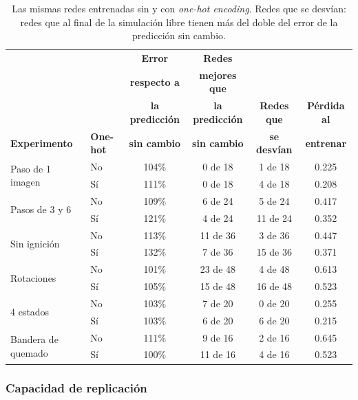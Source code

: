 	\begin{table}[htbp]
		\centering
		\footnotesize
		\setlength{\tabcolsep}{4pt}
		\begin{tabular}{llcccc}
			\toprule
			& & \textbf{Error} & \textbf{Redes} & & \\
			& & \textbf{respecto a} & \textbf{mejores que} & & \\
			& & \textbf{la predicción} & \textbf{la predicción} & \textbf{Redes que} & \textbf{Pérdida al} \\
			\textbf{Experimento} & \textbf{One-hot} & \textbf{sin cambio} & \textbf{sin cambio} & \textbf{se desvían} & \textbf{entrenar} \\ \midrule
			\multirow{2}{*}{Paso de 1 imagen} & No & 104\% & 0 de 18 & 1 de 18 & 0.225 \\
			& Sí & 111\% & 0 de 18 & 4 de 18 & 0.208 \\ \midrule
			\multirow{2}{*}{Pasos de 3 y 6} & No & 109\% & 6 de 24 & 5 de 24 & 0.417 \\
			& Sí & 121\% & 4 de 24 & 11 de 24 & 0.352 \\ \midrule
			\multirow{2}{*}{Sin ignición} & No & 113\% & 11 de 36 & 3 de 36 & 0.447 \\
			& Sí & 132\% & 7 de 36 & 15 de 36 & 0.371 \\ \midrule
			\multirow{2}{*}{Rotaciones} & No & 101\% & 23 de 48 & 4 de 48 & 0.613 \\
			& Sí & 105\% & 15 de 48 & 16 de 48 & 0.523 \\ \midrule
			\multirow{2}{*}{4 estados} & No & 103\% & 7 de 20 & 0 de 20 & 0.255 \\
			& Sí & 103\% & 6 de 20 & 6 de 20 & 0.215 \\ \midrule
			\multirow{2}{*}{Bandera de quemado} & No & 111\% & 9 de 16 & 2 de 16 & 0.645 \\
			& Sí & 100\% & 11 de 16 & 4 de 16 & 0.523 \\ \bottomrule
		\end{tabular}
		\caption{Las mismas redes entrenadas sin y con \textit{one-hot encoding}. Redes que se desvían: redes que al final de la simulación libre tienen más del doble del error de la predicción sin cambio.}
		\label{tab:flame_onehot}
	\end{table}

	\subsubsection{Capacidad de replicación}

